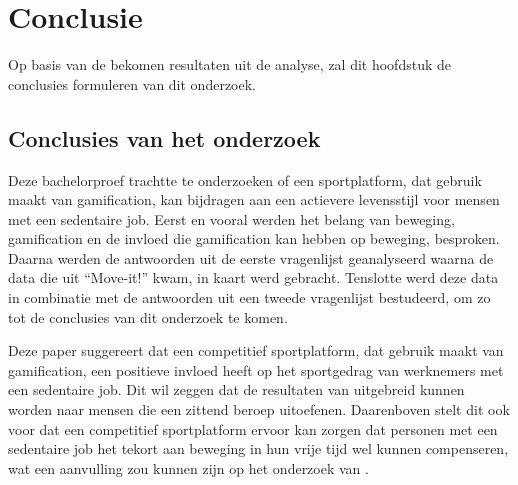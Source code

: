 
\chapter{Conclusie}%
\label{ch:conclusie}

Op basis van de bekomen resultaten uit de analyse, zal dit hoofdstuk de conclusies formuleren van dit onderzoek.


\section{Conclusies van het onderzoek}

Deze bachelorproef trachtte te onderzoeken of een sportplatform, dat gebruik \linebreak maakt van gamification, kan bijdragen aan een actievere levensstijl voor mensen met een sedentaire job.
Eerst en vooral werden het belang van beweging, gamification en de invloed die gamification kan hebben op beweging, besproken. Daarna werden de antwoorden uit de eerste vragenlijst geanalyseerd waarna de data die uit ``Move-it!'' kwam, in kaart werd gebracht. Tenslotte werd deze data in combinatie met de antwoorden uit een tweede vragenlijst bestudeerd, om zo tot de conclusies van dit onderzoek te komen.

Deze paper suggereert dat een competitief sportplatform, dat gebruik maakt van gamification, een positieve invloed heeft op het sportgedrag van werknemers met een sedentaire job. Dit wil zeggen dat de resultaten van \textcite{Kari2016} uitgebreid kunnen worden naar mensen die een zittend beroep uitoefenen. Daarenboven stelt dit ook voor dat een competitief sportplatform ervoor kan zorgen dat personen met een sedentaire job het tekort aan beweging in hun vrije tijd wel kunnen compenseren, wat een aanvulling zou kunnen zijn op het onderzoek van \textcite{Vandelanotte2015}.

